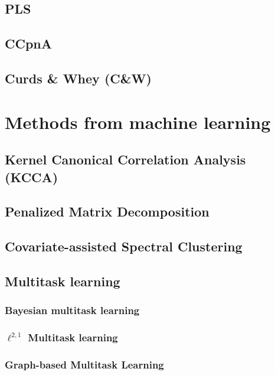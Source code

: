 \documentclass{report}
\begin{document}
\subsection{PLS}
\label{sec:PLS}

\subsection{CCpnA}
\label{sec:canonical-correspondence}

\subsection{Curds \& Whey (C\&W)}
\label{sec:cw}

\section{Methods from machine learning}

\subsection{Kernel Canonical Correlation Analysis (KCCA)}

\subsection{Penalized Matrix Decomposition}

\subsection{Covariate-assisted Spectral Clustering}

\subsection{Multitask learning}
\label{sec:multitask}

\subsubsection{Bayesian multitask learning}

\subsubsection{$\ell^{2, 1}$ Multitask learning}

\subsubsection{Graph-based Multitask Learning}
\end{document}
